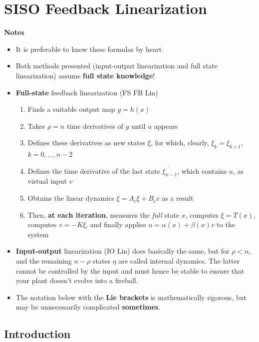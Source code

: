 \section{SISO Feedback Linearization}
\textbf{Notes}
\begin{itemize}
    \item It is preferable to know these formulas by heart.
    \item Both methods presented (input-output linearization and full state linearization) assume \textbf{full state knowledge}!
\end{itemize}

\newpar{}

\begin{itemize}
    \item \textbf{Full-state} feedback linearization (FS FB Lin)
          \begin{enumerate}
              \item Finds a suitable output map $y=h(x)$
              \item Takes $\rho = n$ time derivatives of $y$ until $u$ appears
              \item Defines these derivatives as new states $\xi$, for which, clearly, $\dot{\xi_k} = \xi_{k+1}$, $k=0,\ldots,n-2$
              \item Defines the time derivative of the last state $\dot{\xi_{n-1}}$, which contains $u$, as virtual input $v$
              \item Obtains the linear dynamics $\dot{\xi} = A_c \xi + B_c v$ as a result
              \item Then, \textbf{at each iteration}, measures the \textit{full} state $x$, computes $\xi = T(x)$, computes $v=-K\xi$, and finally applies $u = \alpha(x) + \beta(x)v$ to the system
          \end{enumerate}
    \item \textbf{Input-output} linearization (IO Lin) does basically the same, but for $\rho < n$, and the remaining $n-\rho$ states $\eta$ are called internal dynamics. The latter cannot be controlled by the input and must hence be stable to ensure that your plant doesn't evolve into a fireball.
    \item The notation below with the \textbf{Lie brackets} is mathematically rigorous, but may be unnecessarily complicated \textbf{sometimes}.
\end{itemize}

\subsection{Introduction}\label{intro_FB_lin}

